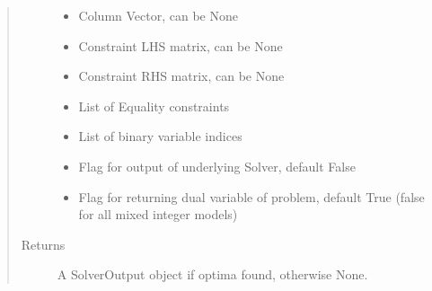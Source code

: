 \documentclass[letterpaper,10pt,english]{sphinxmanual}
\begin{document}
\begin{fulllineitems}
\begin{fulllineitems}
\begin{quote}
\begin{description}
\begin{itemize}
\item {} 
\sphinxAtStartPar
{} \textendash{} Column Vector, can be None

\item {} 
\sphinxAtStartPar
{} \textendash{} Constraint LHS matrix, can be None

\item {} 
\sphinxAtStartPar
{} \textendash{} Constraint RHS matrix, can be None

\item {} 
\sphinxAtStartPar
{} \textendash{} List of Equality constraints

\item {} 
\sphinxAtStartPar
{} \textendash{} List of binary variable indices

\item {} 
\sphinxAtStartPar
{} \textendash{} Flag for output of underlying Solver, default False

\item {} 
\sphinxAtStartPar
{} \textendash{} Flag for returning dual variable of problem, default True (false for all mixed integer models)

\end{itemize}

\item[{Returns}] \leavevmode
\sphinxAtStartPar
A SolverOutput object if optima found, otherwise None.

\end{description}\end{quote}

\end{fulllineitems}



\end{fulllineitems}
\end{document}
